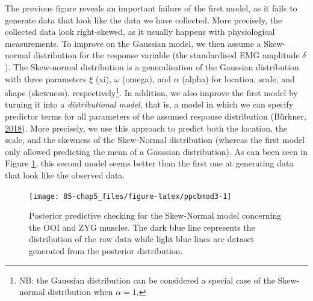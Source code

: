 \documentclass[a4paper,12pt,twoside,openright,oldfontcommands]{memoir}
\let\rmarkdownfootnote\footnote%
\def\footnote{\protect\rmarkdownfootnote}
\begin{document}
The previous figure reveals an important failure of the first model, as it fails to generate data that look like the data we have collected. More precisely, the collected data look right-skewed, as it usually happens with physiological measurements. To improve on the Gaussian model, we then assume a Skew-normal distribution for the response variable (the standardised EMG amplitude \(\delta\)). The Skew-normal distribution is a generalisation of the Gaussian distribution with three parameters \(\xi\) (xi), \(\omega\) (omega), and \(\alpha\) (alpha) for location, scale, and shape (skewness), respectively\footnote{NB: the Gaussian distribution can be considered a special case of the Skew-normal distribution when \(\alpha = 1\).}. In addition, we also improve the first model by turning it into a \emph{distributional model}, that is, a model in which we can specify predictor terms for all parameters of the assumed response distribution (Bürkner, \protect\hyperlink{ref-R-brms}{2018}). More precisely, we use this approach to predict both the location, the scale, and the skewness of the Skew-Normal distribution (whereas the first model only allowed predicting the mean of a Gaussian distribution). As can been seen in Figure \ref{fig:ppcbmod3}, this second model seems better than the first one at generating data that look like the observed data.

\begin{figure}[H]

{\centering \texttt{[image: 05-chap5\_files/figure-latex/ppcbmod3-1]} 

}

\caption{Posterior predictive checking for the Skew-Normal model concerning the OOI and ZYG muscles. The dark blue line represents the distribution of the raw data while light blue lines are dataset generated from the posterior distribution.}\label{fig:ppcbmod3}
\end{figure}
\end{document}
